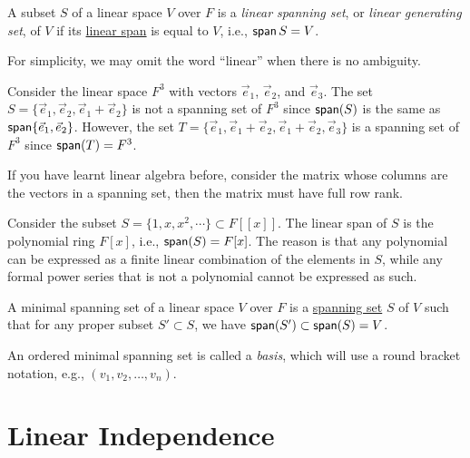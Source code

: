 \begin{definition}\label{def:spanning_set}
  A subset $S$ of a linear space $V$ over $F$ is a \emph{linear spanning set}, or \emph{linear generating set}, of $V$ if its \hyperref[def:span]{linear span} is equal to $V$, i.e., $\operatorname{\text{\normalfont\sffamily span}} S = V$.
\end{definition}

For simplicity, we may omit the word ``linear'' when there is no ambiguity.

\begin{example}
  Consider the linear space $F^3$ with vectors $\vec{e}_1$, $\vec{e}_2$, and $\vec{e}_3$. The set $S = \{ \vec{e}_1, \vec{e}_2, \vec{e}_1 + \vec{e}_2 \}$ is not a spanning set of $F^3$ since $\operatorname{\text{\normalfont\sffamily span}}(S)$ is the same as $\operatorname{\text{\normalfont\sffamily span}} \{\vec{e}_1, \vec{e}_2\}$. However, the set $T = \{ \vec{e}_1, \vec{e}_1 + \vec{e}_2, \vec{e}_1 + \vec{e}_2, \vec{e}_3 \}$ is a spanning set of $F^3$ since $\operatorname{\text{\normalfont\sffamily span}}(T) = F^3$.
\end{example}

\begin{remark}
  If you have learnt linear algebra before, consider the matrix whose columns are the vectors in a spanning set, then the matrix must have full row rank.
\end{remark}

\begin{example}
  Consider the subset $S = \{ 1, x, x^2, \cdots \} \subset F[[x]]$. The linear span of $S$ is the polynomial ring $F[x]$, i.e., $\operatorname{\text{\normalfont\sffamily span}}(S) = F[x]$. The reason is that any polynomial can be expressed as a finite linear combination of the elements in $S$, while any formal power series that is not a polynomial cannot be expressed as such.
\end{example}

\begin{definition}\label{def:minimal_spanning_set}
  A minimal spanning set of a linear space $V$ over $F$ is a \hyperref[def:spanning_set]{spanning set} $S$ of $V$ such that for any proper subset $S' \subset S$, we have $\operatorname{\text{\normalfont\sffamily span}}(S') \subset \operatorname{\text{\normalfont\sffamily span}}(S) = V$.
\end{definition}

\begin{remark}
  An ordered minimal spanning set is called a \emph{basis}, which will use a round bracket notation, e.g., $(v_1, v_2, \ldots, v_n)$.
\end{remark}

\section{Linear Independence}

